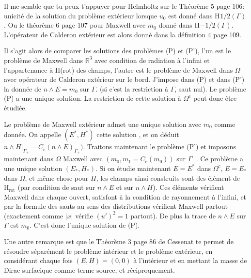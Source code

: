 \documentclass[12pt,%
    twoside,%
    a4paper,%
    openright, %
    ]{book}
\numberwithin{equation}{section} %
\newcommand{\RR}{\mathbb R}
\newcommand{\Sobup}[1][{}]{\mathrm{H}^\mathrm{#1}}
\newcommand{\Sobdw}[1][{}]{\mathrm{H}_\mathrm{#1}}
\newcommand{\Sobolev}[1][{}]{\Sobup{#1}}
\newcommand{\Hrot}{\Sobdw[rot]}
\newcounter{REM}
\newenvironment{REM}[1][\theREM]
    {%
        \stepcounter{REM}
        \hypertarget{REM#1}{}%
        \pdfbookmark[0]{REM \theREM}{REM#1}
        \begin{tcolorbox}[%
                title={Remarque \theREM},%
                colback=red!30!white,%
                colframe=red!75!black,%
            ]
    }
    {
        \end{tcolorbox}%
    }%
\begin{document}
    \begin{REM}
        
        Il me semble que tu peux t'appuyer pour Helmholtz sur le Théorème 5 page 106: unicité de la solution du problème extérieur lorsque \(u_0\) est donné dans \(\Sobolev[1/2](\Gamma)\).
        Ou le théorème 6 page 107 pour Maxwell avec \(m_0\) donné dans \(\Sobolev[-1/2](\Gamma)\).
        L'opérateur de Calderon extérieur est alors donné dans la définition 4 page 109.
        
        Il s'agit alors de comparer les solutions des problèmes (P) et (P'), l'un est le problème de Maxwell dans \(\RR^3\) avec condition de radiation à l'infini et l'appartenance à H(rot) des champs, l'autre est le problème de Maxwell dans \(\Omega\) avec opérateur de Calderon extérieur sur le bord.
        J'impose dans (P) et dans (P') la donnée de \(n\wedge E=m_0\) sur \(\Gamma\). (si c'est la restriction à \(\Gamma\), saut nul).
        Le problème (P)  a une unique solution.
        La restriction de cette solution à \(\Omega^c\) peut donc être étudiée.
        
        
        Le problème de Maxwell extérieur admet une unique solution avec \(m_0\) comme donnée. On appelle \((E^*, H^*)\) cette solution , et on déduit \(n\wedge H\vert_{\Gamma_+}= C_e(n\wedge E)_{\Gamma_+})\).
        Traitons maintenant le problème (P') et imposons maintenant dans \(\Omega\) Maxwell avec \((m_0, m_1=C_e(m_0))\) sur \(\Gamma_-\).
        Ce problème a une unique solution \((E_*, H_*)\).
        Si on étudie maintenant \(E=E^*\) dans \(\Omega^c\), \(E=E_*\) dans \(\Omega\), et même chose pour \(H\), les champs ainsi construits sont des élément de \(\Hrot\) (par condition de saut sur \(n\wedge E\) et sur \(n\wedge H\)).
        Ces éléments vérifient Maxwell dans chaque ouvert, satisfont à la condition de rayonnement à l'infini, et par la formule des sauts au sens des distributions vérifient Maxwell partout (exactement comme \(\vert x\vert\) vérifie \((u')^2=1\) partout).
        De plus la trace de \(n\wedge E\) sur \(\Gamma\) est \(m_0\). C'est donc l'unique solution de (P).
        
        
    \end{REM}
    \begin{REM}
    Une autre remarque est que le Théorème 3 page 86 de Cessenat te permet de résoudre séparément le problème intérieur et le problème extérieur, en considérant chaque fois \((E,H)=(0,0)\) à l'intérieur et en mettant la masse de Dirac surfacique comme terme source, et réciproquement.
    \end{REM}
\end{document}
